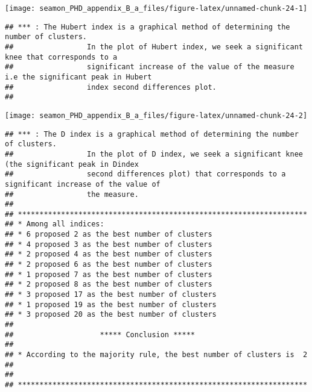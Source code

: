 \documentclass[]{article}
\begin{document}
\texttt{[image: seamon\_PHD\_appendix\_B\_a\_files/figure-latex/unnamed-chunk-24-1]}

\begin{verbatim}
## *** : The Hubert index is a graphical method of determining the number of clusters.
##                 In the plot of Hubert index, we seek a significant knee that corresponds to a 
##                 significant increase of the value of the measure i.e the significant peak in Hubert
##                 index second differences plot. 
## 
\end{verbatim}

\texttt{[image: seamon\_PHD\_appendix\_B\_a\_files/figure-latex/unnamed-chunk-24-2]}

\begin{verbatim}
## *** : The D index is a graphical method of determining the number of clusters. 
##                 In the plot of D index, we seek a significant knee (the significant peak in Dindex
##                 second differences plot) that corresponds to a significant increase of the value of
##                 the measure. 
##  
## ******************************************************************* 
## * Among all indices:                                                
## * 6 proposed 2 as the best number of clusters 
## * 4 proposed 3 as the best number of clusters 
## * 2 proposed 4 as the best number of clusters 
## * 2 proposed 6 as the best number of clusters 
## * 1 proposed 7 as the best number of clusters 
## * 2 proposed 8 as the best number of clusters 
## * 3 proposed 17 as the best number of clusters 
## * 1 proposed 19 as the best number of clusters 
## * 3 proposed 20 as the best number of clusters 
## 
##                    ***** Conclusion *****                            
##  
## * According to the majority rule, the best number of clusters is  2 
##  
##  
## *******************************************************************
\end{verbatim}
\end{document}
